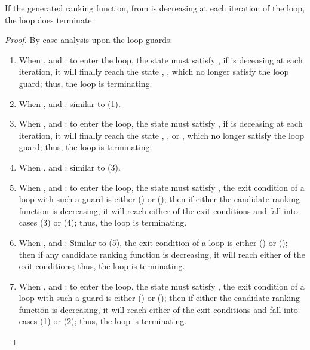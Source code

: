 \documentclass[acmsmall,screen,review,anonymous,nonacm]{acmart}
\begin{document}
\begin{theorem}
If the generated ranking function, from  is decreasing at each iteration of the loop, the loop does terminate. 
\begin{proof} 
By case analysis upon the loop guards: 
\begin{enumerate}
\item When , and : to enter the loop, the state must satisfy , if  is deceasing at each iteration, it will finally reach the state , \ie  
{}, which no longer satisfy the loop guard; thus, the loop is terminating. 
\item When , and : similar to (1). 

\item When , and : to enter the loop, the state must satisfy , if  is deceasing at each iteration, it will finally reach the state , \ie  
{}, or ,  which no longer satisfy the loop guard; thus, the loop is terminating. 

\item When , and : similar to (3). 

\item When , and 
: 
to enter the loop, the state must satisfy , 
the exit condition of a loop with such a guard \code{\pi} is either () or (); then if either the candidate ranking function is decreasing, it will reach either of the 
exit conditions and fall into cases (3) or (4); thus, the loop is terminating. 

\item When , and : Similar to (5), the exit condition of a loop is either () or (); then if any candidate ranking function is decreasing, it will reach either of the exit conditions; thus, the loop is terminating. 


\item When , and : to enter the loop, the state must satisfy , 
the exit condition of a loop with such a guard \code{\pi} is either () or (); then if either the candidate ranking function is decreasing, it will reach either of the 
exit conditions and fall into cases (1) or (2); thus, the loop is terminating. 
\end{enumerate}
\end{proof}
\end{theorem}
\end{document}
